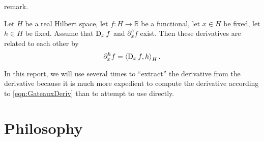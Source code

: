     remark.
    \begin{remark}
        \label{rem:FGR}
        Let \(H\) be a real Hilbert space, let \(f:H \to \mathbb{R}\) be a functional,
        let \(x \in H\) be fixed, let \(h \in H\) be fixed. Assume
        that \(\operatorname{D}_x f\) and \(\partial_x^h f\) exist. Then these derivatives
        are related to each other by
        \[
            \partial_x^h f = \left< \operatorname{D}_x f, h \right>_H.
        \]
    \end{remark}
    In this report, we will use  several
    times to ``extract'' the \Frechet derivative from the \Gateaux derivative
    because it is much more expedient to compute the \Gateaux derivative
    according to \autoref{eqn:GateauxDeriv} than to attempt to use
     directly. 

\section{Philosophy}

